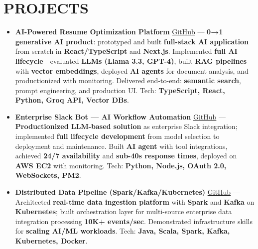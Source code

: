 \documentclass[letterpaper,10pt]{article}
\newcommand{\resumeItem}[1]{\item\small #1}
\begin{document}
\section{\textcolor{metablue}{PROJECTS}}
\vspace{-5pt}
\begin{tcolorbox}[colback=white,colframe=metablue,boxrule=0.8pt,arc=2pt,left=4pt,right=4pt,top=2pt,bottom=2pt]
\begin{itemize}
\resumeItem{\textbf{AI-Powered Resume Optimization Platform} \href{https://github.com/adityasugandhi}{GitHub} --- \textbf{0→1 generative AI product}: prototyped and built \textbf{full-stack AI application} from scratch in \textbf{React/TypeScript} and \textbf{Next.js}. Implemented \textbf{full AI lifecycle}—evaluated \textbf{LLMs (Llama 3.3, GPT-4)}, built \textbf{RAG pipelines} with \textbf{vector embeddings}, deployed \textbf{AI agents} for document analysis, and productionized with monitoring. Delivered end-to-end: \textbf{semantic search}, prompt engineering, and production UI. Tech: \textbf{TypeScript, React, Python, Groq API, Vector DBs}.}
\resumeItem{\textbf{Enterprise Slack Bot — AI Workflow Automation} \href{https://github.com/adityasugandhi}{GitHub} --- \textbf{Productionized LLM-based solution} as enterprise Slack integration; implemented \textbf{full lifecycle development} from model selection to deployment and maintenance. Built \textbf{AI agent} with tool integrations, achieved \textbf{24/7 availability} and \textbf{sub-40s response times}, deployed on \textbf{AWS EC2} with monitoring. Tech: \textbf{Python, Node.js, OAuth 2.0, WebSockets, PM2}.}
\resumeItem{\textbf{Distributed Data Pipeline (Spark/Kafka/Kubernetes)} \href{https://github.com/adityasugandhi}{GitHub} --- Architected \textbf{real-time data ingestion platform} with \textbf{Spark} and \textbf{Kafka} on \textbf{Kubernetes}; built orchestration layer for multi-source enterprise data integration processing \textbf{10K+ events/sec}. Demonstrated infrastructure skills for \textbf{scaling AI/ML workloads}. Tech: \textbf{Java, Scala, Spark, Kafka, Kubernetes, Docker}.}
\end{itemize}
\end{tcolorbox}
\vspace{-5pt}


\end{document}
